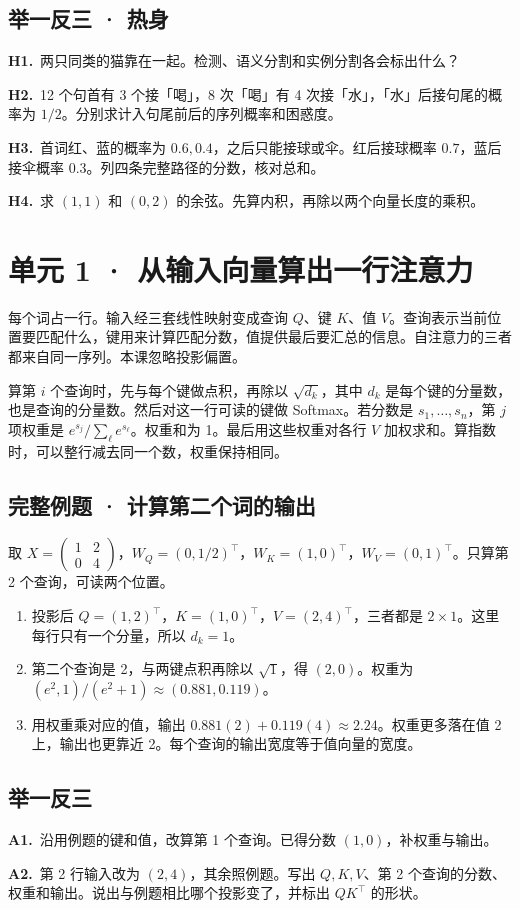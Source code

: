 \documentclass[UTF8,a4paper,11pt]{ctexart}
\newcommand{\PracticeQuestion}[3]{\par\Needspace{4\baselineskip}\noindent\begin{minipage}{\linewidth}\textbf{#1.}\ #2\par\noindent\rule{0pt}{#3mm}\par\end{minipage}\par}
\begin{document}
\subsection{举一反三 · 热身}
\PracticeQuestion{H1}{两只同类的猫靠在一起。检测、语义分割和实例分割各会标出什么？}{22}
\PracticeQuestion{H2}{12 个句首有 3 个接「喝」，8 次「喝」有 4 次接「水」，「水」后接句尾的概率为 $1/2$。分别求计入句尾前后的序列概率和困惑度。}{22}
\PracticeQuestion{H3}{首词红、蓝的概率为 $0.6,0.4$，之后只能接球或伞。红后接球概率 $0.7$，蓝后接伞概率 $0.3$。列四条完整路径的分数，核对总和。}{22}
\PracticeQuestion{H4}{求 $(1,1)$ 和 $(0,2)$ 的余弦。先算内积，再除以两个向量长度的乘积。}{22}
\clearpage
\section{单元 1 · 从输入向量算出一行注意力}
每个词占一行。输入经三套线性映射变成查询 $Q$、键 $K$、值 $V$。查询表示当前位置要匹配什么，键用来计算匹配分数，值提供最后要汇总的信息。自注意力的三者都来自同一序列。本课忽略投影偏置。

算第 $i$ 个查询时，先与每个键做点积，再除以 $\sqrt{d_k}$，其中 $d_k$ 是每个键的分量数，也是查询的分量数。然后对这一行可读的键做 Softmax。若分数是 $s_1,\ldots,s_n$，第 $j$ 项权重是 $e^{s_j}/\sum_\ell e^{s_\ell}$。权重和为 1。最后用这些权重对各行 $V$ 加权求和。算指数时，可以整行减去同一个数，权重保持相同。

\subsection{完整例题 · 计算第二个词的输出}
取 $X=\begin{pmatrix}1&2\\0&4\end{pmatrix}$，$W_Q=(0,1/2)^\top$，$W_K=(1,0)^\top$，$W_V=(0,1)^\top$。只算第 2 个查询，可读两个位置。

\begin{enumerate}
\item 投影后 $Q=(1,2)^\top$，$K=(1,0)^\top$，$V=(2,4)^\top$，三者都是 $2\times1$。这里每行只有一个分量，所以 $d_k=1$。
\item 第二个查询是 2，与两键点积再除以 $\sqrt1$，得 $(2,0)$。权重为 $(e^2,1)/(e^2+1)\approx(0.881,0.119)$。
\item 用权重乘对应的值，输出 $0.881(2)+0.119(4)\approx2.24$。权重更多落在值 2 上，输出也更靠近 2。每个查询的输出宽度等于值向量的宽度。
\end{enumerate}
\subsection{举一反三}
\PracticeQuestion{A1}{沿用例题的键和值，改算第 1 个查询。已得分数 $(1,0)$，补权重与输出。}{23}
\PracticeQuestion{A2}{第 2 行输入改为 $(2,4)$，其余照例题。写出 $Q,K,V$、第 2 个查询的分数、权重和输出。说出与例题相比哪个投影变了，并标出 $QK^\top$ 的形状。}{26}
\clearpage
\end{document}
